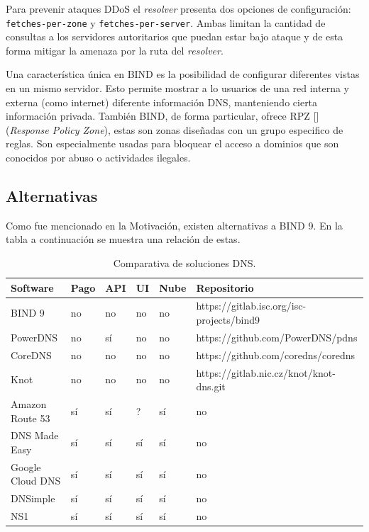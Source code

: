 Para prevenir ataques DDoS el \textit{resolver} presenta dos opciones de configuración: \verb+fetches-per-zone+ y \verb+fetches-per-server+. Ambas limitan la cantidad de consultas a los servidores autoritarios que puedan estar bajo ataque y de esta forma mitigar la amenaza por la ruta del \textit{resolver}.

Una característica única en BIND es la posibilidad de configurar diferentes vistas en un mismo servidor. Esto permite mostrar a lo usuarios de una red interna y externa (como internet) diferente información DNS, manteniendo cierta información privada. También BIND, de forma particular, ofrece RPZ [\cite{rpz}] (\textit{Response Policy Zone}), estas son zonas diseñadas con un grupo especifico de reglas. Son especialmente usadas para bloquear el acceso a dominios que son conocidos por abuso o actividades ilegales.

\subsection{Alternativas}

Como fue mencionado en la Motivación, existen alternativas a BIND 9. En la tabla a continuación se muestra una relación de estas.

\begin{table}[!ht]
    \centering
    \begin{tabular}{|l|l|l|l|l|l|}
    \hline
        Software & Pago & API & UI & Nube & Repositorio \\ \hline
        BIND 9 & no & no & no & no & https://gitlab.isc.org/isc-projects/bind9 \\ \hline
        PowerDNS & no & sí & no & no & https://github.com/PowerDNS/pdns \\ \hline
        CoreDNS & no & no & no & no & https://github.com/coredns/coredns \\ \hline
        Knot & no & no & no & no & https://gitlab.nic.cz/knot/knot-dns.git \\ \hline
        Amazon Route 53 & sí & sí & ? & sí & no \\ \hline
        DNS Made Easy & sí & sí & sí & sí & no \\ \hline
        Google Cloud DNS & sí & sí & sí & sí & no \\ \hline
        DNSimple & sí & sí & sí & sí & no \\ \hline
        NS1 & sí & sí & sí & sí & no \\ \hline
    \end{tabular}
    \caption{Comparativa de soluciones DNS.}
    \label{dns-comparative}
\end{table}

